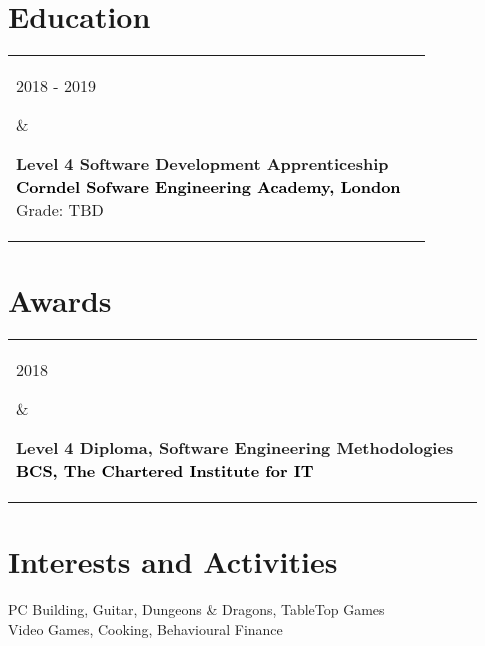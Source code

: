 \documentclass[a4paper,10pt]{article}
\newenvironment{entrylist}{
	\begin{longtable}[H]{l l}
}{
	\end{longtable}
}
\newcommand{\entry}[4]{%
	\parbox[t]{0.175\textwidth}{
		#1 %
	}%
	&\parbox[t]{0.775\textwidth}{
		\textbf{#2}\\
		{\footnotesize \textbf{\textcolor{black}{#3}}}\\
		#4 
	}\\\\}
\begin{document}
\section{Education}

\begin{entrylist}
    \entry
        {2018 - 2019}
        {Level 4 Software Development Apprenticeship}
        {Corndel Sofware Engineering Academy, London}
        {Grade: TBD}
	\entry
		{2014 – 2016}
		{BTEC Level 3 Extended National Diploma in IT}
		{West Suffolk College, Bury St Edmunds}
		{Grade: D*D*D}
\end{entrylist}

\section{Awards}

\begin{entrylist}
    \entry
        {2018}
        {Level 4 Diploma, Software Engineering Methodologies}
        {BCS, The Chartered Institute for IT}
        {}
	\entry
		{2018}
		{Programming in HTML5 with JavaScript and CSS3}
        {Microsoft}
        {}
\end{entrylist}

\section{Interests and Activities}

PC Building, Guitar, Dungeons \& Dragons, TableTop Games\\
Video Games, Cooking, Behavioural Finance
\end{document}
